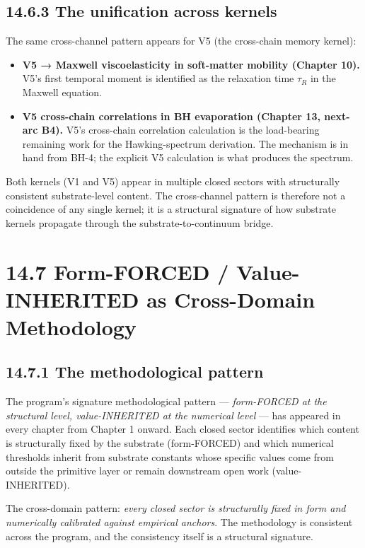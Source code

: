 \documentclass[11pt]{book}
\begin{document}
\subsection{14.6.3 The unification across kernels}

The same cross-channel pattern appears for V5 (the cross-chain memory kernel):

\begin{itemize}
\item \textbf{V5 → Maxwell viscoelasticity in soft-matter mobility (Chapter 10).} V5's first temporal moment is identified as the relaxation time $\tau_R$ in the Maxwell equation.
\item \textbf{V5 cross-chain correlations in BH evaporation (Chapter 13, next-arc B4).} V5's cross-chain correlation calculation is the load-bearing remaining work for the Hawking-spectrum derivation. The mechanism is in hand from BH-4; the explicit V5 calculation is what produces the spectrum.
\end{itemize}

Both kernels (V1 and V5) appear in multiple closed sectors with structurally consistent substrate-level content. The cross-channel pattern is therefore not a coincidence of any single kernel; it is a structural signature of how substrate kernels propagate through the substrate-to-continuum bridge.

\section{14.7 Form-FORCED / Value-INHERITED as Cross-Domain Methodology}

\subsection{14.7.1 The methodological pattern}

The program's signature methodological pattern — \textit{form-FORCED at the structural level, value-INHERITED at the numerical level} — has appeared in every chapter from Chapter 1 onward. Each closed sector identifies which content is structurally fixed by the substrate (form-FORCED) and which numerical thresholds inherit from substrate constants whose specific values come from outside the primitive layer or remain downstream open work (value-INHERITED).

The cross-domain pattern: \textit{every closed sector is structurally fixed in form and numerically calibrated against empirical anchors}. The methodology is consistent across the program, and the consistency itself is a structural signature.
\end{document}
